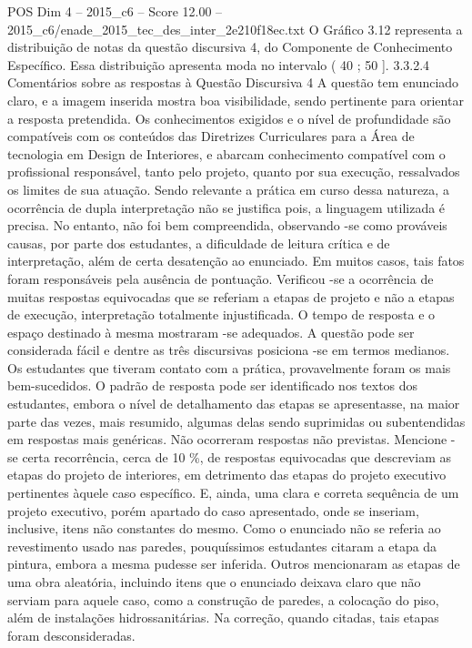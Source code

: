 \begin{textsample}{POS Dim 4 – 2015\_c6 – Score 12.00 – 2015\_c6/enade\_2015\_tec\_des\_inter\_2e210f18ec.txt}
O Gráfico 3.12 representa a distribuição de notas da questão discursiva 4, do Componente de Conhecimento Específico.
Essa distribuição apresenta moda no intervalo ( 40 ; 50 ]. 3.3.2.4 Comentários sobre as respostas à Questão Discursiva 4 A questão tem enunciado claro, e a imagem inserida mostra boa visibilidade, sendo pertinente para orientar a resposta pretendida.
Os conhecimentos exigidos e o nível de profundidade são compatíveis com os conteúdos das Diretrizes Curriculares para a Área de tecnologia em Design de Interiores, e abarcam conhecimento compatível com o profissional responsável, tanto pelo projeto, quanto por sua execução, ressalvados os limites de sua atuação.
Sendo relevante a prática em curso dessa natureza, a ocorrência de dupla interpretação não se justifica pois, a linguagem utilizada é precisa.
No entanto, não foi bem compreendida, observando -se como prováveis causas, por parte dos estudantes, a dificuldade de leitura crítica e de interpretação, além de certa desatenção ao enunciado.
Em muitos casos, tais fatos foram responsáveis pela ausência de pontuação.
Verificou -se a ocorrência de muitas respostas equivocadas que se referiam a etapas de projeto e não a etapas de execução, interpretação totalmente injustificada.
O tempo de resposta e o espaço destinado à mesma mostraram -se adequados.
A questão pode ser considerada fácil e dentre as três discursivas posiciona -se em termos medianos.
Os estudantes que tiveram contato com a prática, provavelmente foram os mais bem-sucedidos.
O padrão de resposta pode ser identificado nos textos dos estudantes, embora o nível de detalhamento das etapas se apresentasse, na maior parte das vezes, mais resumido, algumas delas sendo suprimidas ou subentendidas em respostas mais genéricas.
Não ocorreram respostas não previstas.
Mencione -se certa recorrência, cerca de 10 \%, de respostas equivocadas que descreviam as etapas do projeto de interiores, em detrimento das etapas do projeto executivo pertinentes àquele caso específico.
E, ainda, uma clara e correta sequência de um projeto executivo, porém apartado do caso apresentado, onde se inseriam, inclusive, itens não constantes do mesmo.
Como o enunciado não se referia ao revestimento usado nas paredes, pouquíssimos estudantes citaram a etapa da pintura, embora a mesma pudesse ser inferida.
Outros mencionaram as etapas de uma obra aleatória, incluindo itens que o enunciado deixava claro que não serviam para aquele caso, como a construção de paredes, a colocação do piso, além de instalações hidrossanitárias.
Na correção, quando citadas, tais etapas foram desconsideradas.

\end{textsample}

